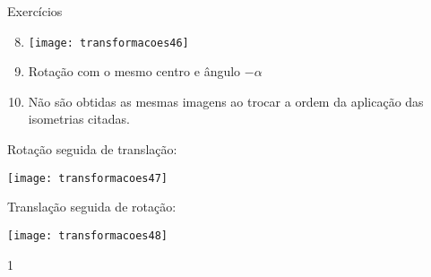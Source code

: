 \begin{answer}{Exercícios}
{\exerciselist
\begin{enumerate}\setcounter{enumi}{7}
\item {}
{
\texttt{[image: transformacoes46]}
}

\item Rotação com o mesmo centro e ângulo $-\alpha$


\item Não são obtidas as mesmas imagens ao trocar a ordem da aplicação das isometrias citadas. 
\end{enumerate}

\begin{multicols}{2}
\centering
Rotação seguida de translação:

\texttt{[image: transformacoes47]}

\columnbreak

Translação seguida de rotação:

\texttt{[image: transformacoes48]}
\end{multicols}
}{1}
\end{answer}

\exercise
{}\label{transformacoes-exercise2}

